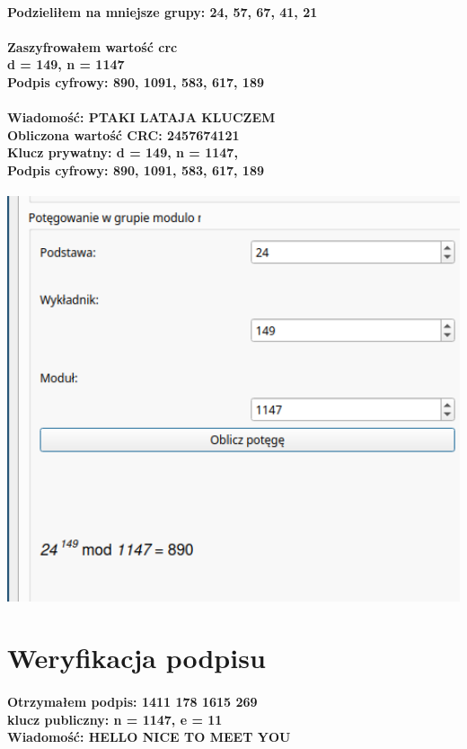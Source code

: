 \documentclass{article}[12pt]
\begin{document}
\paragraph{Podzieliłem na mniejsze grupy: 24, 57, 67, 41, 21}
\paragraph{Zaszyfrowałem wartość crc \\ d = 149, n = 1147 \\ Podpis cyfrowy: 890, 1091, 583, 617, 189 \\}
\paragraph{Wiadomość: PTAKI LATAJA KLUCZEM \\ Obliczona wartość CRC: 2457674121 \\ Klucz prywatny: d = 149, n = 1147, \\ Podpis cyfrowy: 890, 1091, 583, 617, 189 \\}
\includegraphics[width=1\textwidth]{twenty.png} 
\section{Weryfikacja podpisu}
\paragraph{Otrzymałem podpis: 1411 178 1615 269 \\ klucz publiczny: n = 1147, e = 11 \\ Wiadomość: HELLO NICE TO MEET YOU}
\end{document}

